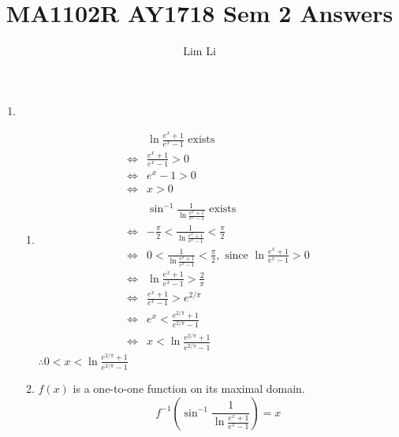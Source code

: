 \documentclass[12pt]{article}
\theoremstyle{definition}
\begin{document}
\title{MA1102R AY1718 Sem 2 Answers}
\author{Lim Li}
\maketitle
\begin{enumerate}
  \item\begin{enumerate}
          \item
                \begin{align*}
                       & \ln{\frac{e^x+1}{e^x-1}} \text{ exists}                                                     \\
                  \iff & \frac{e^x+1}{e^x-1}>0                                                                       \\
                  \iff & e^x-1>0                                                                                     \\
                  \iff & x>0                                                                                         \\\\
                       & \sin^{-1}\frac{1}{\ln{\frac{e^x+1}{e^x-1}}} \text{ exists}                                  \\
                  \iff & -\frac{\pi}{2}<\frac{1}{\ln{\frac{e^x+1}{e^x-1}}}<\frac{\pi}{2}                             \\
                  \iff & 0<\frac{1}{\ln{\frac{e^x+1}{e^x-1}}}<\frac{\pi}{2},\text{ since }\ln{\frac{e^x+1}{e^x-1}}>0 \\
                  \iff & \ln{\frac{e^x+1}{e^x-1}} > \frac{2}{\pi}                                                    \\
                  \iff & \frac{e^x+1}{e^x-1} > e^{2/\pi}                                                             \\
                  \iff & e^{x}<\frac{e^{2/\pi}+1}{e^{2/\pi}-1}                                                       \\
                  \iff & x < \ln{\frac{e^{2/\pi}+1}{e^{2/\pi}-1}}
                \end{align*}
                $\therefore 0 < x < \ln{\frac{e^{2/\pi}+1}{e^{2/\pi}-1}}$
          \item $f(x)$ is a one-to-one function on its maximal domain.\\
                \begin{equation*}
                  f^{-1}(\sin^{-1}\frac{1}{\ln{\frac{e^x+1}{e^x-1}}})=x

\end{equation*}
\end{enumerate}
\end{enumerate}
\end{document}
